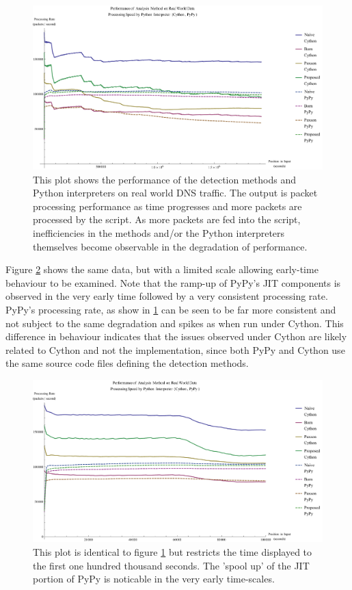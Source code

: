 \documentclass[12pt]{report}
\theoremstyle{remark}
\theoremstyle{definition}
\theoremstyle{definition}
\theoremstyle{definition}
\begin{document}
\begin{figure}
\centering
\includegraphics[width=\textwidth]{figures/pmqr.pdf}
\caption[Performance of Analysis Method and Python Interpreter on Real World
Data]{This plot shows the performance of the detection methods and Python
interpreters on real world DNS traffic. The output is packet processing performance as time
progresses and more packets are processed by the script. As more packets are fed
into the script, inefficiencies in the methods and/or the Python interpreters
themselves become observable in the degradation of performance.}
\label{pmqr}
\end{figure}

Figure \ref{pmqr-100k} shows the same data, but with a limited scale allowing
early-time behaviour to be examined. Note that the ramp-up of PyPy's JIT
components is observed in the very early time followed by a very consistent
processing rate. PyPy's processing rate, as show in \ref{pmqr} can be seen to be
far more consistent and not subject to the same degradation and spikes as when
run under Cython. This difference in behaviour indicates that the issues
observed under Cython are likely related to Cython and not the implementation,
since both PyPy and Cython use the same source code files defining the detection
methods.

\begin{figure}
\centering
\includegraphics[width=\textwidth]{figures/pmqr-100k.pdf}
\caption[Performance of Analysis Method and Python Interpreter on Real World
Data - Early Time]{This plot is identical to figure \ref{pmqr} but restricts the time
displayed to the first one hundred thousand seconds. The 'spool up' of the JIT
portion of PyPy is noticable in the very early time-scales.}
\label{pmqr-100k}
\end{figure}
\end{document}
